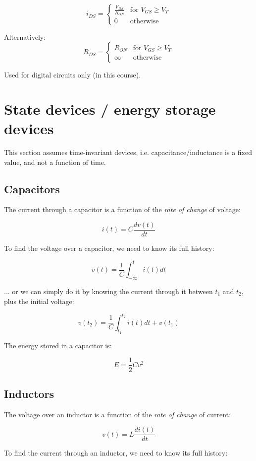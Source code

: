 \documentclass[12pt,a4paper]{report}
\begin{document}
\[ 
  i_{DS} = \begin{cases}
  \frac{V_{DS}}{R_{ON}} & \text{for $V_{GS} \ge V_T$} \\
  0 & \text{otherwise}
  \end{cases}
\]

Alternatively:
\[ 
  R_{DS} = \begin{cases}
  R_{ON} & \text{for $V_{GS} \ge V_T$} \\
  \infty & \text{otherwise}
  \end{cases}
\]

Used for digital circuits only (in this course).

\section{State devices / energy storage devices}
This section assumes time-invariant devices, i.e. capacitance/inductance is a fixed value, and not a function of time.

\subsection{Capacitors}

The current through a capacitor is a function of the \emph{rate of change} of voltage:

\[ i(t) = C \frac{dv(t)}{dt} \]

To find the voltage over a capacitor, we need to know its full history:

\[ v(t) = \frac{1}{C} \int_{-\infty}^{t} i(t) dt \]

... or we can simply do it by knowing the current through it between $t_1$ and $t_2$, plus the initial voltage:

\[ v(t_2) = \frac{1}{C} \int_{t_1}^{t_2} i(t) dt + v(t_1) \]

The energy stored in a capacitor is:

\[ E = \frac{1}{2} C v^2 \]

\subsection{Inductors}

The voltage over an inductor is a function of the \emph{rate of change} of current:

\[ v(t) = L \frac{di(t)}{dt} \]

To find the current through an inductor, we need to know its full history:
\end{document}
